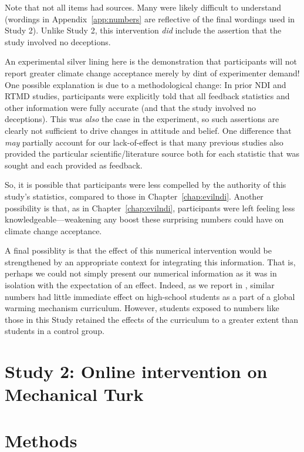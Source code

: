 Note that not all items had sources. Many were likely difficult to understand
(wordings in Appendix~\ref{app:numbers} are reflective of the final wordings
used in Study 2). Unlike Study 2, this intervention \emph{did} include the
assertion that the study involved no deceptions.

An experimental silver lining here is the demonstration that
participants will not report greater climate change acceptance merely by dint of
experimenter demand! One possible explanation is due to a methodological change:
In prior NDI and RTMD studies, participants were explicitly told that all
feedback statistics and other information were fully accurate (and that the
study involved no deceptions). This was \emph{also} the case in the experiment,
so such assertions are clearly not sufficient to drive changes in attitude and
belief.  One difference that \emph{may} partially account for our lack-of-effect
is that many previous studies also provided the particular scientific/literature
source both for each statistic that was sought and each provided as feedback.

So, it is possible that participants were less compelled by the authority of
this study’s statistics, compared to those in Chapter~\ref{chap:evilndi}.
Another possibility is that, as in Chapter~\ref{chap:evilndi}, participants were
left feeling less knowledgeable—weakening any boost these surprising numbers
could have on climate change acceptance.  

A final possiblity is that the effect of this numerical intervention would be
strengthened by an appropriate context for integrating this information. That
is, perhaps we could not simply present our numerical information as it was in
isolation with the expectation of an effect. Indeed, as we report in
\cite{clark_knowledge_inpress}, similar numbers had little immediate effect on
high-school students as a part of a global warming mechanism curriculum.
However, students exposed to numbers like those in this Study retained the
effects of the curriculum to a greater extent than students in a control group.

\section{Study 2: Online intervention on Mechanical Turk}

\section{Methods}

